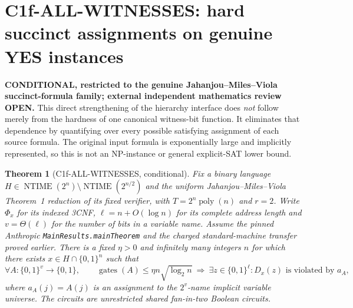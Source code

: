 \documentclass[11pt]{article}
\newtheorem{theorem}{Theorem}
\begin{document}
\section{C1f-ALL-WITNESSES: hard succinct assignments on genuine YES instances}
\textbf{CONDITIONAL, restricted to the genuine Jahanjou--Miles--Viola
succinct-formula family; external independent mathematics review OPEN.}
This direct strengthening of the hierarchy interface does \emph{not}
follow merely from the hardness of one canonical witness-bit
function. It eliminates that dependence by quantifying over every
possible satisfying assignment of each source formula. The original
input formula is exponentially large and implicitly represented, so
this is not an NP-instance or general explicit-SAT lower bound.

\begin{theorem}[C1f-ALL-WITNESSES, conditional]
Fix a binary language
$H\in\operatorname{NTIME}(2^n)\setminus
 \operatorname{NTIME}(2^{n/2})$ and the uniform
Jahanjou--Miles--Viola Theorem~1 reduction of its fixed verifier,
with $T=2^n\operatorname{poly}(n)$ and $r=2$.
Write $\Phi_x$ for its indexed 3CNF,
$\ell=n+O(\log n)$ for its complete address length and
$v=\Theta(\ell)$ for the number of bits in a variable name.
Assume the pinned Anthropic \texttt{MainResults.mainTheorem}
and the charged standard-machine transfer proved earlier.
There is a fixed $\eta>0$ and infinitely many integers $n$
for which there exists $x\in H\cap\{0,1\}^n$ such that
\[
 \forall A:\{0,1\}^v\longrightarrow\{0,1\},\qquad
 \operatorname{gates}(A)\le\eta n\sqrt{\log_2 n}
 \ \Longrightarrow\
 \exists z\in\{0,1\}^{\ell}:
 D_x(z)\text{ is violated by }a_A,
\]
where $a_A(j)=A(j)$ is an assignment to the
$2^v$-name implicit variable universe.
The circuits are unrestricted \emph{shared} fan-in-two Boolean circuits.
\end{theorem}
\end{document}
